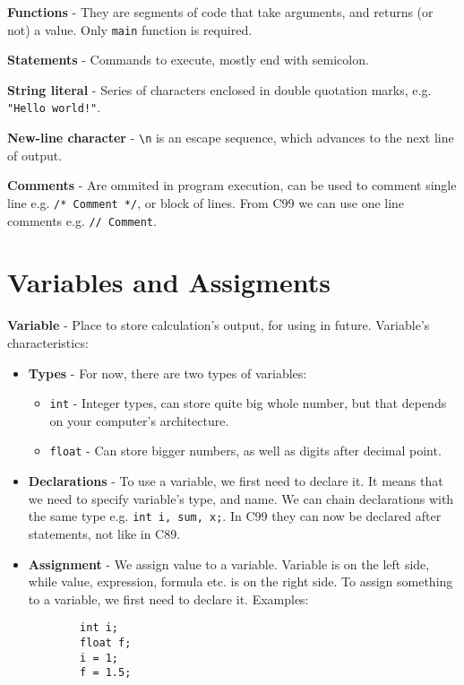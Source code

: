 \documentclass[12pt, openany]{book}
\begin{document}
    \textbf{Functions} - They are segments of code that take arguments, and
    returns (or not) a value. Only \texttt{main} function is required.

    \textbf{Statements} - Commands to execute, mostly end with semicolon.

    \bigskip
    \textbf{String literal} - Series of characters enclosed in double quotation marks,
    e.g. \texttt{"Hello world!"}.

    \textbf{New-line character} - \texttt{\textbackslash n} is an escape sequence, which
    advances to the next line of output.

    \textbf{Comments} - Are ommited in program execution, can be used to comment single line
    e.g. \texttt{/* Comment */}, or block of lines. From C99 we can use one line comments
    e.g. \texttt{// Comment}.

    \section{Variables and Assigments}

    \textbf{Variable} - Place to store calculation's output, for using in future.
    Variable's characteristics:
    \begin{itemize}
        \item 
        \textbf{Types} - For now, there are two types of variables:
        \begin{itemize}
            \item \texttt{int} - Integer types, can store quite big whole number, but
            that depends on your computer's architecture.
            \item \texttt{float} - Can store bigger numbers, as well as digits after
            decimal point.
        \end{itemize}

        \item 
        \textbf{Declarations} - To use a variable, we first need to declare it. It
        means that we need to specify variable's type, and name. We can chain declarations
        with the same type e.g. \texttt{int i, sum, x;}. In C99 they can now be declared
        after statements, not like in C89.
        
        \item
        \textbf{Assignment} - We assign value to a variable. Variable is on the left
        side, while value, expression, formula etc. is on the right side. To assign
        something to a variable, we first need to declare it. Examples:
        \begin{lstlisting}
        int i;
        float f;
        i = 1;
        f = 1.5;
        \end{lstlisting}
    \end{itemize}
\end{document}
